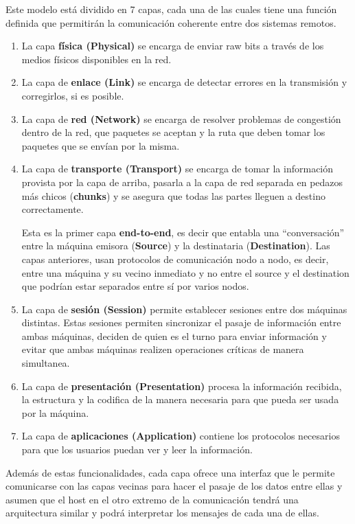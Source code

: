 Este modelo está dividido en 7 capas, cada una de las cuales tiene una función definida que permitirán la comunicación coherente entre dos sistemas remotos.  

\begin{enumerate}
  \item La capa \textbf{física (Physical)} se encarga de enviar raw bits a través de los medios físicos disponibles en la red. 
  \item La capa de \textbf{enlace (Link)} se encarga de detectar errores en la transmisión y corregirlos, si es posible.
  \item La capa de \textbf{red (Network)} se encarga de resolver problemas de congestión dentro de la red, que paquetes se aceptan y la ruta que deben tomar los paquetes que se envían por la misma.
  \item La capa de \textbf{transporte (Transport)} se encarga de tomar la información provista por la capa de arriba, pasarla a la capa de red separada en pedazos más chicos (\textbf{chunks}) y se asegura que todas las partes lleguen a destino correctamente. 
  
  Esta es la primer capa \textbf{end-to-end}, es decir que entabla una ``conversación''      entre la máquina emisora (\textbf{Source}) y la destinataria (\textbf{Destination}). Las capas anteriores, usan protocolos de comunicación nodo a nodo, es decir, entre una máquina y su vecino inmediato y no entre el source y el destination que podrían estar separados entre sí por varios nodos.
  
  \item La capa de \textbf{sesión  (Session)} permite establecer sesiones entre dos máquinas distintas. Estas sesiones permiten sincronizar el pasaje de información entre ambas máquinas, deciden de quien es el turno para enviar información y evitar que ambas máquinas realizen operaciones críticas de manera simultanea.
  \item La capa de \textbf{presentación (Presentation)} procesa la información recibida, la estructura y la codifica de la manera necesaria para que pueda ser usada por la máquina.
  \item La capa de \textbf{aplicaciones (Application)} contiene los protocolos necesarios para que los usuarios puedan ver y leer la información.
\end{enumerate}

Además de estas funcionalidades, cada capa ofrece una interfaz que le permite comunicarse con las capas vecinas para hacer el pasaje de los datos entre ellas y asumen que el host en el otro extremo de la comunicación tendrá una arquitectura similar y podrá interpretar los mensajes de cada una de ellas.

